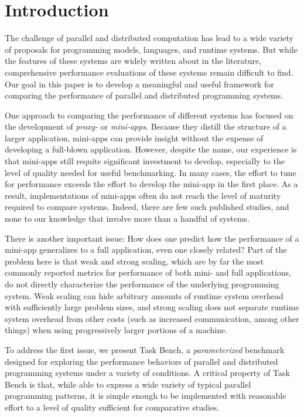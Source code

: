 \section{Introduction}
\label{sec:introduction}

The challenge of parallel and distributed computation has lead to a
wide variety of proposals for programming models, languages, and
runtime systems. But while the features of these systems are widely
written about in the literature, comprehensive performance evaluations
of these systems remain difficult to find. Our
goal in this paper is to develop a meaningful and useful framework for
comparing the performance of parallel and distributed programming
systems.



One approach to comparing the performance of different systems has
focused on the development of \emph{proxy-} or
\emph{mini-apps}. Because they distill the structure of a larger
application, mini-apps can provide insight
without the expense of developing a full-blown
application. However, despite the name, our experience is that
mini-apps still requite significant investment to develop, especially
to the level of quality needed for useful benchmarking. In many cases,
the effort to tune for performance exceeds the effort to develop the
mini-app in the first place. As a result, implementations of mini-apps
often do not reach the level of maturity required to compare
systems. Indeed, there are few such published studies, and none to our
knowledge that involve more than a handful of systems.

There is another important issue: How does one predict how
the performance of a mini-app generalizes to a full
application, even one closely related? Part of the problem here is
that weak and strong scaling, which are by far the most commonly
reported metrics for performance of both mini- and full applications,
do not directly characterize the performance of the underlying
programming system. Weak scaling can hide arbitrary amounts of runtime
system overhead with sufficiently large problem sizes, and strong
scaling does not separate runtime system overhead from other costs
(such as increased communication, among other things) when
using progressively larger portions of a machine.

To address the first issue, we present Task Bench, a
\emph{parameterized} benchmark designed for exploring the performance
behaviors of parallel and distributed programming systems under a
variety of conditions. A critical property of Task Bench is that,
while able to express a wide variety of typical parallel programming
patterns, it is simple enough to be implemented with reasonable effort
to a level of quality sufficient for comparative studies.

